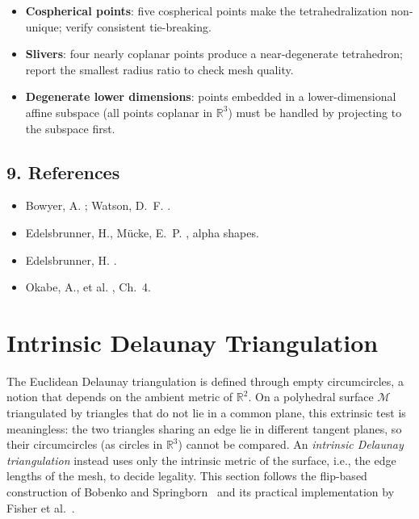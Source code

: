 \begin{itemize}
\item \textbf{Cospherical points}: five cospherical points make the
  tetrahedralization non-unique; verify consistent tie-breaking.
\item \textbf{Slivers}: four nearly coplanar points produce a near-degenerate
  tetrahedron; report the smallest radius ratio to check mesh quality.
\item \textbf{Degenerate lower dimensions}: points embedded in a
  lower-dimensional affine subspace (all points coplanar in $\mathbb{R}^3$)
  must be handled by projecting to the subspace first.
\end{itemize}

\subsection{9. References}

\begin{itemize}
\item Bowyer, A. \cite{bowyer1981}; Watson, D.~F. \cite{watson1981}.
\item Edelsbrunner, H., M\"ucke, E.~P. \cite{edelsbrunner1994}, alpha shapes.
\item Edelsbrunner, H. \cite{edelsbrunner1987}.
\item Okabe, A., et al. \cite{okabe2000}, Ch.~4.
\end{itemize}

\section{Intrinsic Delaunay Triangulation}
\label{sec:delaunay_intrinsic}

The Euclidean Delaunay triangulation is defined through empty circumcircles, a notion that depends on the ambient metric of $\mathbb{R}^2$. On a polyhedral surface $\mathcal{M}$ triangulated by triangles that do not lie in a common plane, this extrinsic test is meaningless: the two triangles sharing an edge lie in different tangent planes, so their circumcircles (as circles in $\mathbb{R}^3$) cannot be compared. An \emph{intrinsic Delaunay triangulation} instead uses only the intrinsic metric of the surface, i.e., the edge lengths of the mesh, to decide legality. This section follows the flip-based construction of Bobenko and Springborn~\cite{bobenko2007} and its practical implementation by Fisher et al.\ \cite{fisher2007}.

